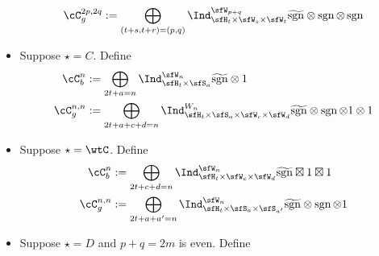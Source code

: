 \documentclass[12pt,a4paper]{amsart}
\newcommand{\Res}{\mathrm{Res}}
\newcommand{\sgn}{\operatorname{sgn}}
\numberwithin{equation}{section}
\theoremstyle{remark}
\def\Irr{\mathrm{Irr}}
\def\Cint#1{\Coh_{[#1]}}
\def\bsgn{\overline{\sgn}}
\def\Coh{\mathrm{Coh}}
\def\hsgn{\widetilde{\mathrm{sgn}}}
\begin{document}
\begin{itemize}
\[\begin{split}
          \cC_g^{2p,2q} %
          &:=\bigoplus_{\substack{(t+s,t+r)=(p,q)}} \Ind_{\sfH_{t} \times \sfW_s\times \sfW_t}^{\sfW_{p+q}}
          \hsgn \otimes \sgn \otimes \sgn \\
        \end{split}
        \]
  \item Suppose $\star=C$. Define
        \[
        \begin{split}
          \cC_b^{n} &
          :=\bigoplus_{\substack{2t+a=n}} %
          \Ind_{\sfH_{t} \times \sfS_a}^{\sfW_{n}} \hsgn\otimes 1 %
          \\
          \cC_g^{n,n} &:= \bigoplus_{2t+a+c+d=n}\Ind_{\sfH_{t} \times \sfS_{a} \times \sfW_c\times \sfW_d}^{W_{n}} \hsgn \otimes
          \sgn \otimes 1 \otimes 1\\
        \end{split}
        \]
  \item Suppose $\star=\wtC$. Define
        \[
        \begin{split}
          \cC_b^{n} &
          :=\bigoplus_{\substack{2t+c+d=n}} %
          \Ind_{\sfH_{t} \times \sfW_c\times \sfW_{d}}^{\sfW_{n}} \hsgn\boxtimes 1 \boxtimes
          1 %
          \\
          \cC_g^{n,n} &:= \bigoplus_{2t+a+a'=n}\Ind_{\sfH_{t} \times \sfS_{a} \times \sfS_{a'}}^{\sfW_{n}} \hsgn \otimes
          \sgn \otimes 1 \\
        \end{split}
        \]
  \item Suppose $\star=D$ and $p+q=2m$ is even. Define
        \[
\]
\end{itemize}
\end{document}
